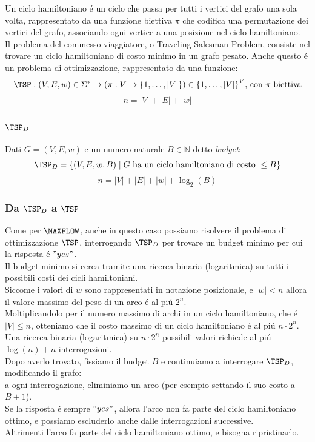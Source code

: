 Un ciclo hamiltoniano é un ciclo che passa per tutti i vertici del grafo una sola volta,
rappresentato da una funzione biettiva $\pi$ che codifica una permutazione dei vertici del grafo, 
associando ogni vertice a una posizione nel ciclo hamiltoniano. \\

Il problema del commesso viaggiatore, o Traveling Salesman Problem, consiste nel trovare
un ciclo hamiltoniano di costo minimo in un grafo pesato.
Anche questo é un problema di ottimizzazione, rappresentato da una funzione:
\[
\TSP: (V, E, w) \in \Sigma^* \rightarrow (\pi : V \rightarrow \{1,\dots,|V|\}) \in {\{1,\dots,|V|\}}^V \text{, con } \pi \text{ biettiva}
\]
\[
n = |V| + |E| + |w|
\]


\subsubsection{$\TSP_D$}
Dati $G = (V, E, w)$ e un numero naturale $B \in \mathbb{N}$ detto \textit{budget}:
\[
\TSP_D = \{ (V, E, w, B) \mid G \text{ ha un ciclo hamiltoniano di costo } \leq B \}
\]
\[
n = |V| + |E| + |w| + \log_2(B)
\]

\subsubsection{Da $\TSP_D$ a $\TSP$}
Come per $\MAXFLOW$, anche in questo caso possiamo risolvere il problema di ottimizzazione $\TSP$,
interrogando $\TSP_D$ per trovare un budget minimo per cui la risposta é $"yes"$. \\
Il budget minimo si cerca tramite una ricerca binaria (logaritmica) su tutti i possibili costi dei cicli hamiltoniani. \\

Siccome i valori di $w$ sono rappresentati in notazione posizionale, e $|w| < n$ allora il valore massimo
del peso di un arco é al piú $2^n$. \\
Moltiplicandolo per il numero massimo di archi in un ciclo hamiltoniano, che é $|V| \leq n$,
otteniamo che il costo massimo di un ciclo hamiltoniano é al piú $n \cdot 2^n$. \\
Una ricerca binaria (logaritmica) su $n \cdot 2^n$ possibili valori richiede al piú $\log(n) + n$ interrogazioni. \\

Dopo averlo trovato, fissiamo il budget $B$ e continuiamo a interrogare $\TSP_D$, modificando il grafo: \\ 
a ogni interrogazione, eliminiamo un arco (per esempio settando il suo costo a $B + 1$). \\
Se la risposta é sempre $"yes"$, allora l'arco non fa parte del ciclo hamiltoniano ottimo, e possiamo escluderlo anche dalle interrogazioni successive. \\
Altrimenti l'arco fa parte del ciclo hamiltoniano ottimo, e bisogna ripristinarlo. \\

